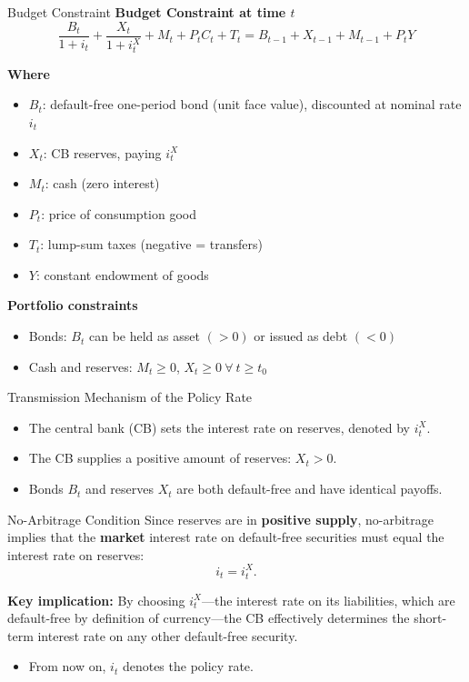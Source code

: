\documentclass[11pt,aspectratio=169]{beamer}
\begin{document}
\begin{frame}[label=orig_budget]{Budget Constraint}
\small
\textbf{Budget Constraint at time $t$}
\begin{equation}
\frac{B_t}{1+i_t} + \frac{X_t}{1+i_t^X} + M_t + P_t C_t + T_t
= B_{t-1} + X_{t-1} + M_{t-1} + P_t Y
\label{eq: budget}
\end{equation}

\textbf{Where}
\begin{itemize}
  \item $B_t$: default-free one-period bond (unit face value), discounted at nominal rate $i_t$
  \item $X_t$: CB reserves, paying $i_t^X$
  \item $M_t$: cash (zero interest)
  \item $P_t$: price of consumption good
  \item $T_t$: lump-sum taxes (negative = transfers)
  \item $Y$: constant endowment of goods
\end{itemize}

\textbf{Portfolio constraints}
\begin{itemize}
  \item Bonds: $B_t$ can be held as asset $(>0)$ or issued as debt $(<0)$
  \item Cash and reserves: $M_t \ge 0$, $X_t \ge 0 \ \forall \ t \ge t_0$
\end{itemize}
\end{frame}

\begin{frame}{Transmission Mechanism of the Policy Rate}

\begin{itemize}
  \item The central bank (CB) sets the interest rate on reserves, denoted by $i_t^X$.
  \item The CB supplies a positive amount of reserves: $X_t > 0$.
  \item Bonds $B_t$ and reserves $X_t$ are both default-free and have identical payoffs.
\end{itemize}

\begin{block}{No-Arbitrage Condition}
Since reserves are in \textbf{positive supply}, no-arbitrage implies that the \textbf{market} interest rate on default-free securities must equal the interest rate on reserves:
\[
i_t = i_t^X.
\]

\textbf{Key implication:} By choosing $i_t^X$—the interest rate on its liabilities, which are default-free by definition of currency—the CB effectively determines the short-term interest rate on any other default-free security.
\end{block}

\begin{itemize}
  \item From now on, $i_t$ denotes the policy rate.
\end{itemize}

\end{frame}
\end{document}
